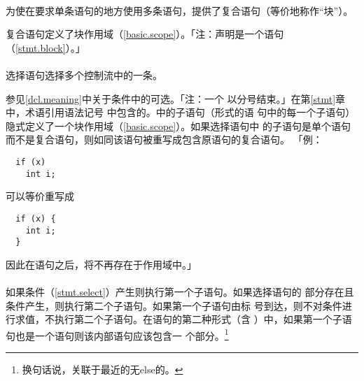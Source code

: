 \paragraph{}
为使在要求单条语句的地方使用多条语句，提供了复合语句（等价地称作``块''）。


复合语句定义了块作用域（\ref{basic.scope}）。「注：声明是一个语句
（\ref{stmt.block}）。」

\paragraph{}
选择语句选择多个控制流中的一条。


参见\ref{dcl.meaning}中关于条件中的可选。「注：一个
以分号结束。」在第\ref{stmt}章中，术语引用语法记号
中包含的。中的子语句（形式的语
句中的每一个子语句）隐式定义了一个块作用域（\ref{basic.scope}）。如果选择语句中
的子语句是单个语句而不是复合语句，则如同该语句被重写成包含原语句的复合语句。
「例：
\begin{lstlisting}
  if (x)
    int i;
\end{lstlisting}
可以等价重写成
\begin{lstlisting}
  if (x) {
    int i;
  }
\end{lstlisting}
因此在语句之后，将不再存在于作用域中。」

\paragraph{}
如果条件（\ref{stmt.select}）产生则执行第一个子语句。如果选择语句的
部分存在且条件产生，则执行第二个子语句。如果第一个子语句由标
号到达，则不对条件进行求值，不执行第二个子语句。在语句的第二种形式（含
）中，如果第一个子语句也是一个语句则该内部语句应该包含一
个部分。\footnote{换句话说，关联于最近的无else的。}

